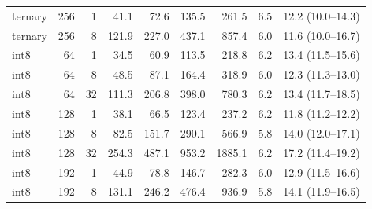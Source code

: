 \begin{tabular}{lrrrrrrrr}
ternary & 256 & 1 & 41.1 & 72.6 & 135.5 & 261.5 & 6.5 & 12.2 (10.0--14.3) \\
ternary & 256 & 8 & 121.9 & 227.0 & 437.1 & 857.4 & 6.0 & 11.6 (10.0--16.7) \\
int8 & 64 & 1 & 34.5 & 60.9 & 113.5 & 218.8 & 6.2 & 13.4 (11.5--15.6) \\
int8 & 64 & 8 & 48.5 & 87.1 & 164.4 & 318.9 & 6.0 & 12.3 (11.3--13.0) \\
int8 & 64 & 32 & 111.3 & 206.8 & 398.0 & 780.3 & 6.2 & 13.4 (11.7--18.5) \\
int8 & 128 & 1 & 38.1 & 66.5 & 123.4 & 237.2 & 6.2 & 11.8 (11.2--12.2) \\
int8 & 128 & 8 & 82.5 & 151.7 & 290.1 & 566.9 & 5.8 & 14.0 (12.0--17.1) \\
int8 & 128 & 32 & 254.3 & 487.1 & 953.2 & 1885.1 & 6.2 & 17.2 (11.4--19.2) \\
int8 & 192 & 1 & 44.9 & 78.8 & 146.7 & 282.3 & 6.0 & 12.9 (11.5--16.6) \\
int8 & 192 & 8 & 131.1 & 246.2 & 476.4 & 936.9 & 5.8 & 14.1 (11.9--16.5) \\
\bottomrule\end{tabular}
